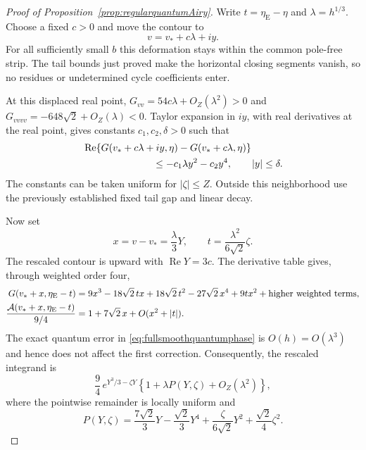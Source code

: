 \begin{proof}[Proof of Proposition~\ref{prop:regularquantumAiry}]
Write $t=\eta_{\mathrm E}-\eta$ and $\lambda=h^{1/3}$.
Choose a fixed $c>0$ and move the contour to
\[
 v=v_*+c\lambda+iy.
\]
For all sufficiently small $b$ this deformation stays within
the common pole-free strip. The tail bounds just proved make
the horizontal closing segments vanish, so no residues or
undetermined cycle coefficients enter.

At this displaced real point,
$G_{vv}=54c\lambda+O_Z(\lambda^2)>0$ and
$G_{vvvv}=-648\sqrt2+O_Z(\lambda)<0$.
Taylor expansion in $iy$, with real derivatives at the real
point, gives constants $c_1,c_2,\delta>0$ such that
\begin{equation}
 \begin{split}
 &\operatorname{Re}\{G(v_*+c\lambda+iy,\eta)
                     -G(v_*+c\lambda,\eta)\}\\
 &\hspace{25mm}\le -c_1\lambda y^2-c_2y^4,
       \qquad |y|\le\delta.
 \end{split}
 \label{eq:AiryGaussianbound}
\end{equation}
The constants can be taken uniform for $|\zeta|\le Z$.
Outside this neighborhood use the previously established
fixed tail gap and linear decay.

Now set
\[
 x=v-v_*=\frac{\lambda}{3}Y,\qquad
 t=\frac{\lambda^2}{6\sqrt2}\zeta.
\]
The rescaled contour is upward with $\operatorname{Re}Y=3c$.
The derivative table gives, through weighted order four,
\begin{align}
 G(v_*+x,\eta_{\mathrm E}-t)
 &=9x^3-18\sqrt2\,tx
   +18\sqrt2\,t^2-27\sqrt2\,x^4+9tx^2
   +\text{higher weighted terms},\notag\\
 \frac{\mathcal A(v_*+x,\eta_{\mathrm E}-t)}{9/4}
 &=1+7\sqrt2\,x+O(x^2+|t|).
 \label{eq:Airyweightedexpansion}
\end{align}
The exact quantum error in
\eqref{eq:fullsmoothquantumphase} is $O(h)=O(\lambda^3)$
and hence does not affect the first correction.
Consequently, the rescaled integrand is
\begin{equation}
 \frac94\,e^{Y^3/3-\zeta Y}
 \left\{1+\lambda P(Y,\zeta)+O_Z(\lambda^2)\right\},
 \label{eq:Airyscaledquantum}
\end{equation}
where the pointwise remainder is locally uniform and
\begin{equation}
 P(Y,\zeta)=
 \frac{7\sqrt2}{3}Y-\frac{\sqrt2}{3}Y^4
 +\frac{\zeta}{6\sqrt2}Y^2
 +\frac{\sqrt2}{4}\zeta^2.
 \label{eq:Airycorrectionpolynomial}
\end{equation}


\end{proof}
